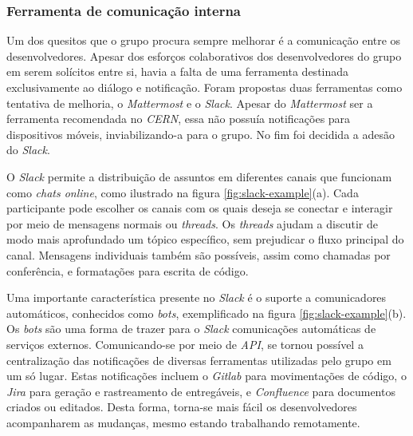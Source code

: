 \hypertarget{ferramenta-de-comunicacao-interna}{%
\subsubsection{Ferramenta de comunicação interna}\label{ferramenta-de-comunicacao-interna}}

Um dos quesitos que o grupo procura sempre melhorar é a comunicação entre os desenvolvedores. Apesar dos esforços colaborativos dos desenvolvedores do grupo em serem solícitos entre si, havia a falta de uma ferramenta destinada exclusivamente ao diálogo e notificação. Foram propostas duas ferramentas como tentativa de melhoria, o \emph{Mattermost} e o \emph{Slack}. Apesar do \emph{Mattermost} ser a ferramenta recomendada no \emph{CERN}, essa não possuía notificações para dispositivos móveis, inviabilizando-a para o grupo. No fim foi decidida a adesão do \emph{Slack}.

O \emph{Slack} permite a distribuição de assuntos em diferentes canais que funcionam como \emph{chats online}, como ilustrado na figura \ref{fig:slack-example}(a). Cada participante pode escolher os canais com os quais deseja se conectar e interagir por meio de mensagens normais ou \emph{threads}. Os \emph{threads} ajudam a discutir de modo mais aprofundado um tópico específico, sem prejudicar o fluxo principal do canal. Mensagens individuais também são possíveis, assim como chamadas por conferência, e formatações para escrita de código.

Uma importante característica presente no \emph{Slack} é o suporte a comunicadores automáticos, conhecidos como \emph{bots}, exemplificado na figura \ref{fig:slack-example}(b). Os \emph{bots} são uma forma de trazer para o \emph{Slack} comunicações automáticas de serviços externos. Comunicando-se por meio de \emph{API}, se tornou possível a centralização das notificações de diversas ferramentas utilizadas pelo grupo em um só lugar. Estas notificações incluem o \emph{Gitlab} para movimentações de código, o \emph{Jira} para geração e rastreamento de entregáveis, e \emph{Confluence} para documentos criados ou editados. Desta forma, torna-se mais fácil os desenvolvedores acompanharem as mudanças, mesmo estando trabalhando remotamente.

